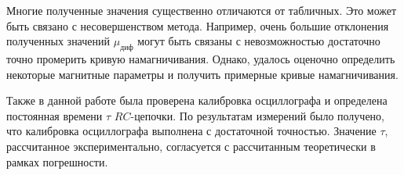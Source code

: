 \documentclass[a4paper, 12pt]{article}
\begin{document}
Многие полученные значения существенно отличаются от табличных. Это может быть связано с несовершенством метода. Например, очень большие отклонения полученных значений $\mu_{диф}$ могут быть связаны с невозможностью достаточно точно промерить кривую намагничивания. Однако, удалось оценочно определить некоторые магнитные параметры и получить примерные кривые намагничивания.

Также в данной работе была проверена калибровка осциллографа и определена постоянная времени $\tau$ $RC$-цепочки. По результатам измерений было получено, что калибровка осциллографа выполнена с достаточной точностью. Значение $\tau$, рассчитанное экспериментально, согласуется с рассчитанным теоретически в рамках погрешности. 
\end{document}
